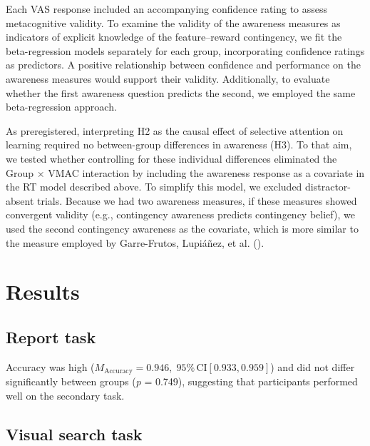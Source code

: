\documentclass[
  man,
  floatsintext,
  longtable,
  nolmodern,
  notxfonts,
  notimes,
  mask,
  colorlinks=true,linkcolor=blue,citecolor=blue,urlcolor=blue]{apa7}
\begin{document}
Each VAS response included an accompanying confidence rating to assess
metacognitive validity. To examine the validity of the awareness
measures as indicators of explicit knowledge of the feature--reward
contingency, we fit the beta-regression models separately for each
group, incorporating confidence ratings as predictors. A positive
relationship between confidence and performance on the awareness
measures would support their validity. Additionally, to evaluate whether
the first awareness question predicts the second, we employed the same
beta-regression approach.

As preregistered, interpreting H2 as the causal effect of selective
attention on learning required no between-group differences in awareness
(H3). To that aim, we tested whether controlling for these individual
differences eliminated the Group \(\times\) VMAC interaction by
including the awareness response as a covariate in the RT model
described above. To simplify this model, we excluded distractor-absent
trials. Because we had two awareness measures, if these measures showed
convergent validity (e.g., contingency awareness predicts contingency
belief), we used the second contingency awareness as the covariate,
which is more similar to the measure employed by Garre-Frutos, Lupiáñez,
et al. ().

\section{Results}\label{results}

\subsection{Report task}\label{report-task-1}

Accuracy was high
(\(M_{\text{Accuracy}} = 0.946, \;95\%\,\text{CI}[0.933, 0.959]\)) and
did not differ significantly between groups (\emph{p} = 0.749),
suggesting that participants performed well on the secondary task.

\subsection{Visual search task}\label{visual-search-task-1}
\end{document}
